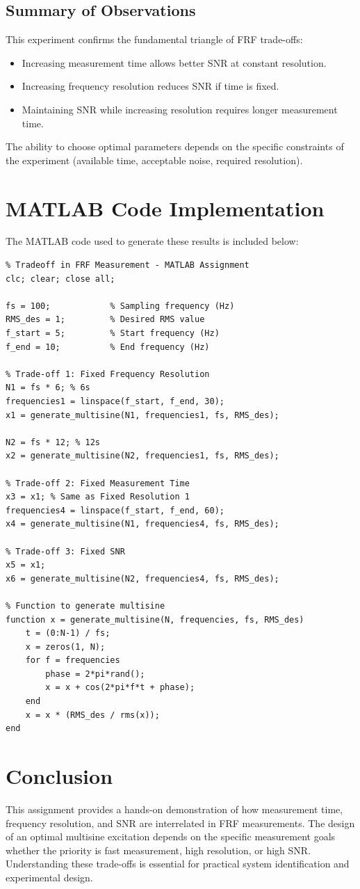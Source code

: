 \documentclass[a4paper,12pt]{article}
\begin{document}
\subsection*{Summary of Observations}
This experiment confirms the fundamental triangle of FRF trade-offs:
\begin{itemize}
    \item Increasing measurement time allows better SNR at constant resolution.
    \item Increasing frequency resolution reduces SNR if time is fixed.
    \item Maintaining SNR while increasing resolution requires longer measurement time.
\end{itemize}
The ability to choose optimal parameters depends on the specific constraints of the experiment (available time, acceptable noise, required resolution).

\section*{MATLAB Code Implementation}
The MATLAB code used to generate these results is included below:

\lstset{language=Matlab, basicstyle=\ttfamily\small, breaklines=true}
\begin{lstlisting}
% Tradeoff in FRF Measurement - MATLAB Assignment
clc; clear; close all;

fs = 100;            % Sampling frequency (Hz)
RMS_des = 1;         % Desired RMS value
f_start = 5;         % Start frequency (Hz)
f_end = 10;          % End frequency (Hz)

% Trade-off 1: Fixed Frequency Resolution
N1 = fs * 6; % 6s
frequencies1 = linspace(f_start, f_end, 30);
x1 = generate_multisine(N1, frequencies1, fs, RMS_des);

N2 = fs * 12; % 12s
x2 = generate_multisine(N2, frequencies1, fs, RMS_des);

% Trade-off 2: Fixed Measurement Time
x3 = x1; % Same as Fixed Resolution 1
frequencies4 = linspace(f_start, f_end, 60);
x4 = generate_multisine(N1, frequencies4, fs, RMS_des);

% Trade-off 3: Fixed SNR
x5 = x1;
x6 = generate_multisine(N2, frequencies4, fs, RMS_des);

% Function to generate multisine
function x = generate_multisine(N, frequencies, fs, RMS_des)
    t = (0:N-1) / fs;
    x = zeros(1, N);
    for f = frequencies
        phase = 2*pi*rand();
        x = x + cos(2*pi*f*t + phase);
    end
    x = x * (RMS_des / rms(x));
end
\end{lstlisting}

\section*{Conclusion}
This assignment provides a hands-on demonstration of how measurement time, frequency resolution, and SNR are interrelated in FRF measurements. The design of an optimal multisine excitation depends on the specific measurement goals whether the priority is fast measurement, high resolution, or high SNR. Understanding these trade-offs is essential for practical system identification and experimental design.
\end{document}

